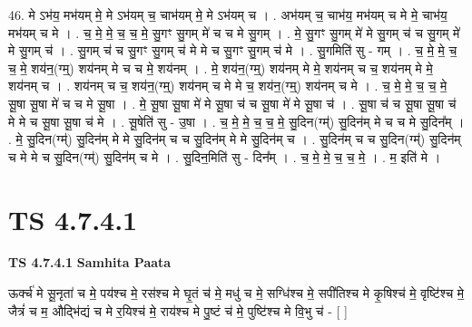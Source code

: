 \documentclass[17pt]{extarticle}
\begin{document}
46. मे ऽभ॑य॒ मभ॑यम् मे॒ मे ऽभ॑यम् च॒ चाभ॑यम् मे॒ मे ऽभ॑यम् च । . अभ॑यम् च॒ चाभ॑य॒ मभ॑यम् च मे मे॒ चाभ॑य॒ मभ॑यम् च मे । . च॒ मे॒ मे॒ च॒ च॒ मे॒ सु॒गꣳ सु॒गम् मे॑ च च मे सु॒गम् । . मे॒ सु॒गꣳ सु॒गम् मे॑ मे सु॒गम् च॑ च सु॒गम् मे॑ मे सु॒गम् च॑ । . सु॒गम् च॑ च सु॒गꣳ सु॒गम् च॑ मे मे च सु॒गꣳ सु॒गम् च॑ मे । . सु॒गमिति॑ सु - गम् । . च॒ मे॒ मे॒ च॒ च॒ मे॒ शय॑न॒(ग्म्॒) शय॑नम् मे च च मे॒ शय॑नम् । . मे॒ शय॑न॒(ग्म्॒) शय॑नम् मे मे॒ शय॑नम् च च॒ शय॑नम् मे मे॒ शय॑नम् च । . शय॑नम् च च॒ शय॑न॒(ग्म्॒) शय॑नम् च मे मे च॒ शय॑न॒(ग्म्॒) शय॑नम् च मे । . च॒ मे॒ मे॒ च॒ च॒ मे॒ सू॒षा सू॒षा मे॑ च च मे सू॒षा । . मे॒ सू॒षा सू॒षा मे॑ मे सू॒षा च॑ च सू॒षा मे॑ मे सू॒षा च॑ । . सू॒षा च॑ च सू॒षा सू॒षा च॑ मे मे च सू॒षा सू॒षा च॑ मे । . सू॒षेति॑ सु - उ॒षा । . च॒ मे॒ मे॒ च॒ च॒ मे॒ सु॒दिन(ग्म्॑) सु॒दिन॑म् मे च च मे सु॒दिन᳚म् । . मे॒ सु॒दिन(ग्म्॑) सु॒दिन॑म् मे मे सु॒दिन॑म् च च सु॒दिन॑म् मे मे सु॒दिन॑म् च । . सु॒दिन॑म् च च सु॒दिन(ग्म्॑) सु॒दिन॑म् च मे मे च सु॒दिन(ग्म्॑) सु॒दिन॑म् च मे । . सु॒दिन॒मिति॑ सु - दिन᳚म् । . च॒ मे॒ मे॒ च॒ च॒ मे॒ । . म॒ इति॑ मे । \newline
\pagebreak
{}

\section{ TS 4.7.4.1 }

\textbf{TS 4.7.4.1 } \newline
\textbf{Samhita Paata} \newline

ऊर्क्च॑ मे सू॒नृता॑ च मे॒ पय॑श्च मे॒ रस॑श्च मे घृ॒तं च॑ मे॒ मधु॑ च मे॒ सग्धि॑श्च मे॒ सपी॑तिश्च मे कृ॒षिश्च॑ मे॒ वृष्टि॑श्च मे॒ जैत्रं॑ च म॒ औद्भि॑द्यं च मे र॒यिश्च॑ मे॒ राय॑श्च मे पु॒ष्टं च॑ मे॒ पुष्टि॑श्च मे वि॒भु च॑ - [  ] \newline
\end{document}
